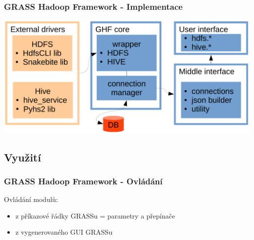 \documentclass[unicode,bookmarksnumbered]{beamer}
\begin{document}
		
		\begin{frame}
			\frametitle{GRASS Hadoop Framework - Implementace}
			\centering
			\includegraphics[width=1\textwidth]{./img/ghf/implementation.pdf}
		\end{frame}
	
	
	\subsection{Využití}
			\begin{frame}
				\frametitle{GRASS Hadoop Framework - Ovládání}
				Ovládání modulů:
			
				\begin{itemize}
					\item  z příkazové řádky GRASSu = parametry a přepínače
					\item  z vygenerovaného GUI GRASSu
				\end{itemize}
				
			\end{frame}
			
\end{document}
